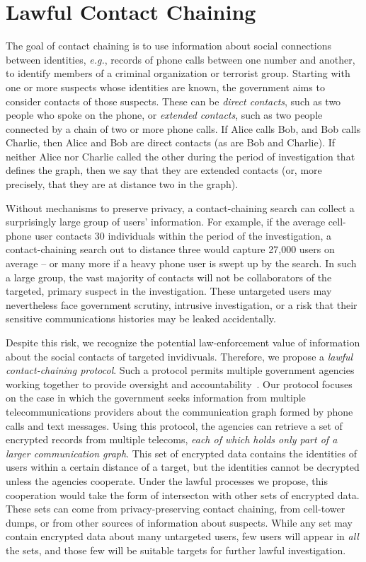 \section{Lawful Contact Chaining}\label{sec-chaining}
The goal of contact chaining is to use information about social connections between identities, {\it e.g.}, records of phone calls between one number and another, to identify members of a criminal organization or terrorist group. Starting with one or more suspects whose identities are known, the government aims to consider contacts of those suspects. These can be \emph{direct contacts}, such as two people who spoke on the phone, or \emph{extended contacts}, such as two people connected by a chain of two or more phone calls. If Alice calls Bob, and Bob calls Charlie, then Alice and Bob are direct contacts (as are Bob and Charlie).  If neither Alice nor Charlie called the other during the period of investigation that defines the graph, then we say that they are extended contacts (or, more precisely, that they are at distance two in the graph). 

Without mechanisms to preserve privacy, a contact-chaining search can collect a surprisingly large group of users' information. For example, if the average 
cell-phone user contacts 30 individuals within the period of the investigation,
a contact-chaining search out to distance three would capture 27,000 users on
average -- or many more if a heavy phone user is swept up by the search. In
such a large group, the vast majority of contacts will not be collaborators of
the targeted, primary suspect in the investigation. These untargeted users
may nevertheless face government scrutiny, intrusive investigation, or a risk
that their sensitive communications histories may be leaked accidentally.

Despite this risk, 
we recognize the potential law-enforce\-ment value of information about the
social contacts of targeted invidivuals. Therefore, we propose a \emph{lawful
contact-chaining protocol}. Such a protocol permits multiple government agencies
working together to provide oversight and accountability~\cite{sff-foci2014}.
Our protocol focuses on the case in which the government seeks information from
multiple telecommunications providers about the communication graph formed by
phone calls and text messages. Using this protocol, the agencies can retrieve a
set of encrypted records from multiple telecoms, {\it each of which holds only
part of a larger communication graph}. This set of encrypted data 
contains the identities of users within a certain distance of a target, but the
identities cannot be decrypted unless the agencies cooperate. Under the lawful
processes we propose, this cooperation would take the form of intersecton with
other sets of encrypted data. These sets can come from privacy-preserving
contact chaining, from cell-tower dumps, or from other sources of information
about suspects. While any set may contain encrypted data about
many untargeted users, few users will appear in \emph{all} the sets, and
those few will be suitable targets for further lawful investigation.


